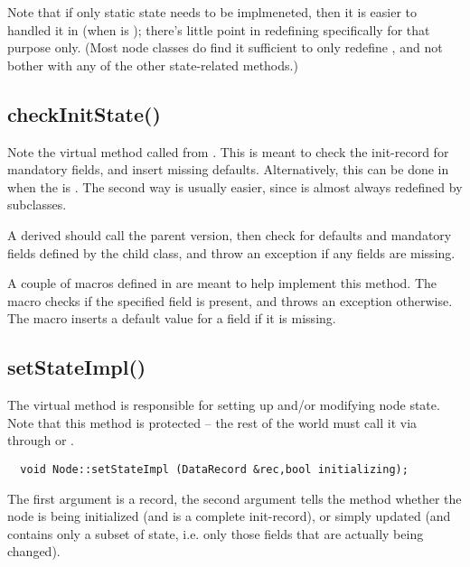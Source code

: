   Note that if only static state needs to be implmeneted, then it is easier to
  handled it in  (when  is );
  there's little point in redefining  specifically for that purpose
  only. (Most node classes do find it sufficient to only redefine
  , and not bother with any of the other state-related
  methods.) 

\subsection{checkInitState()}
  
  Note the virtual  method called from .
  This is meant to check the init-record for mandatory fields, and insert
  missing defaults. Alternatively, this can be done in  when
  the  is . The second way is usually easier, since
   is almost always redefined by subclasses.

  A derived  should call the parent version, then check
  for defaults and mandatory fields defined by the child class, and throw an
  exception if any fields are missing.

  A couple of macros defined in  are meant to help implement this
  method. The  macro checks if the specified
  field is present, and throws an exception otherwise. The
   macro inserts a default value for a
  field if it is missing.  
  
\subsection{setStateImpl()}

  The virtual  method is responsible for setting up and/or
  modifying node state. Note that this method is protected -- the rest of the
  world must call it via through  or .

  \begin{verbatim}
  void Node::setStateImpl (DataRecord &rec,bool initializing);
  \end{verbatim}
  
  The first argument is a record, the second argument tells the method whether
  the node is being initialized (and  is a complete init-record), or
  simply updated (and  contains only a subset of state, i.e. only those
  fields that are actually being changed).
  
